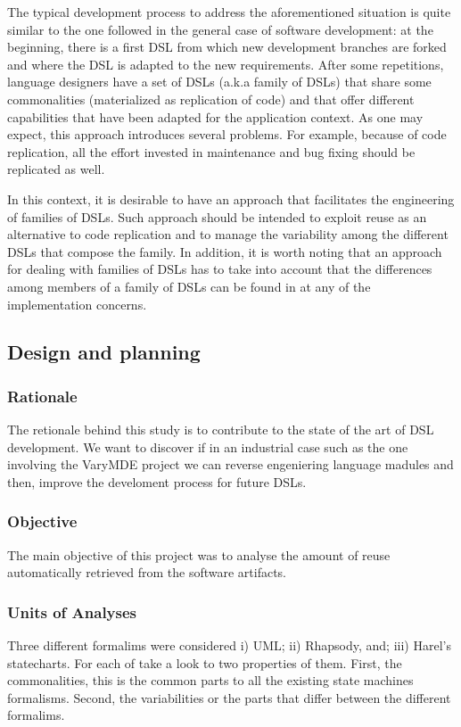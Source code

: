 The typical development process to address the aforementioned situation is quite similar to the one followed in the general case of software development: at the beginning, there is a first DSL from which new development branches are forked and where the DSL is adapted to the new requirements. After some repetitions, language designers have a set of DSLs (a.k.a family of DSLs) that share some commonalities (materialized as replication of code) and that offer different capabilities that have been adapted for the application context. As one may expect, this approach introduces several problems. For example, because of code replication, all the effort invested in maintenance and bug fixing should be replicated as well.

In this context, it is desirable to have an approach that facilitates the engineering of families of DSLs. Such approach should be intended to exploit reuse as an alternative to code replication and to manage the variability among the different DSLs that compose the family. In addition, it is worth noting that an approach for dealing with families of DSLs has to take into account that the differences among members of a family of DSLs can be found in at any of the implementation concerns.


\subsection{Design and planning}

\subsubsection{Rationale}
The retionale behind this study is to contribute to the state of the art of DSL development. We want to discover if in an industrial case such as the one involving the VaryMDE project we can reverse engeniering language madules and then, improve the develoment process for future DSLs.

\subsubsection{Objective}
The main objective of this project was to analyse the amount of reuse automatically retrieved from the software artifacts.

\subsubsection{Units of Analyses}
Three different formalims were considered i) UML; ii) Rhapsody, and; iii) Harel's statecharts. For each of take a look to two properties of them. First, the commonalities, this is the common parts to all the existing state machines formalisms. Second, the variabilities or the parts that differ between the different formalims.

